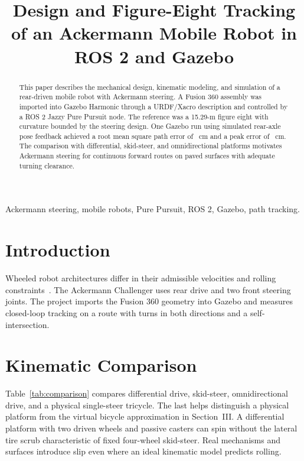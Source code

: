 \documentclass[conference]{IEEEtran}
\title{Design and Figure-Eight Tracking of an Ackermann Mobile Robot in ROS 2 and Gazebo}
\author{\IEEEauthorblockN{Robotics Project Group 4}
\IEEEauthorblockA{Ackermann Challenger mobile robotics project}}
\begin{document}
\maketitle

\begin{abstract}
This paper describes the mechanical design, kinematic modeling, and simulation of a rear-driven mobile robot with Ackermann steering. A Fusion 360 assembly was imported into Gazebo Harmonic through a URDF/Xacro description and controlled by a ROS 2 Jazzy Pure Pursuit node. The reference was a 15.29-m figure eight with curvature bounded by the steering design. One Gazebo run using simulated rear-axle pose feedback achieved a root mean square path error of \RunRMSE\ cm and a peak error of \RunMax\ cm. The comparison with differential, skid-steer, and omnidirectional platforms motivates Ackermann steering for continuous forward routes on paved surfaces with adequate turning clearance.
\end{abstract}

\begin{IEEEkeywords}
Ackermann steering, mobile robots, Pure Pursuit, ROS 2, Gazebo, path tracking.
\end{IEEEkeywords}

\section{Introduction}
Wheeled robot architectures differ in their admissible velocities and rolling constraints~\cite{lynch}. The Ackermann Challenger uses rear drive and two front steering joints. The project imports the Fusion 360 geometry into Gazebo and measures closed-loop tracking on a route with turns in both directions and a self-intersection.

\section{Kinematic Comparison}
Table~\ref{tab:comparison} compares differential drive, skid-steer, omnidirectional drive, and a physical single-steer tricycle. The last helps distinguish a physical platform from the virtual bicycle approximation in Section~III. A differential platform with two driven wheels and passive casters can spin without the lateral tire scrub characteristic of fixed four-wheel skid-steer. Real mechanisms and surfaces introduce slip even where an ideal kinematic model predicts rolling.
\end{document}
